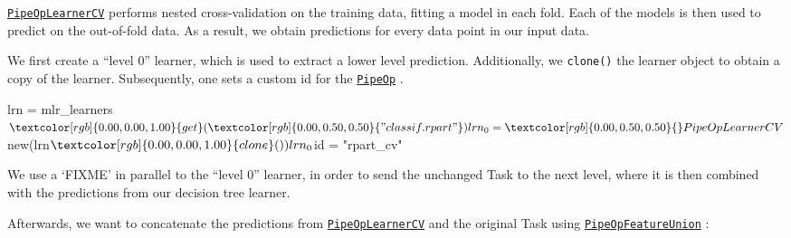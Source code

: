 \documentclass[]{article}
\newenvironment{Shaded}{}{}
\newcommand{\DecValTok}[1]{#1}
\newcommand{\KeywordTok}[1]{\textcolor[rgb]{0.00,0.00,1.00}{#1}}
\newcommand{\NormalTok}[1]{#1}
\newcommand{\OperatorTok}[1]{#1}
\newcommand{\StringTok}[1]{\textcolor[rgb]{0.00,0.50,0.50}{#1}}
\renewenvironment{Shaded} {\begin{snugshade}\small} {\end{snugshade}}
\begin{document}
\href{https://mlr3pipelines.mlr-org.com/reference/mlr_pipeops_learner_cv.html}{\texttt{PipeOpLearnerCV}} performs nested cross-validation on the training data, fitting a model in each fold.
Each of the models is then used to predict on the out-of-fold data.
As a result, we obtain predictions for every data point in our input data.

We first create a ``level 0'' learner, which is used to extract a lower level prediction.
Additionally, we \texttt{clone()} the learner object to obtain a copy of the learner.
Subsequently, one sets a custom id for the \href{https://mlr3pipelines.mlr-org.com/reference/PipeOp.html}{\texttt{PipeOp}} .

\begin{Shaded}
\begin{Highlighting}[]
\NormalTok{lrn =}\StringTok{ }\NormalTok{mlr_learners}\OperatorTok{$}\KeywordTok{get}\NormalTok{(}\StringTok{"classif.rpart"}\NormalTok{)}
\NormalTok{lrn_}\DecValTok{0}\NormalTok{ =}\StringTok{ }\NormalTok{PipeOpLearnerCV}\OperatorTok{$}\KeywordTok{new}\NormalTok{(lrn}\OperatorTok{$}\KeywordTok{clone}\NormalTok{())}
\NormalTok{lrn_}\DecValTok{0}\OperatorTok{$}\NormalTok{id =}\StringTok{ "rpart_cv"}
\end{Highlighting}
\end{Shaded}

We use a `FIXME' in parallel to the ``level 0'' learner, in order to send the unchanged Task to the next level, where it is then combined with the predictions from our decision tree learner.

\begin{Shaded}
\end{Shaded}

Afterwards, we want to concatenate the predictions from \href{https://mlr3pipelines.mlr-org.com/reference/mlr_pipeops_learner_cv.html}{\texttt{PipeOpLearnerCV}} and the original Task using \href{https://mlr3pipelines.mlr-org.com/reference/mlr_pipeops_featureunion.html}{\texttt{PipeOpFeatureUnion}} :

\begin{Shaded}
\end{Shaded}
\end{document}
